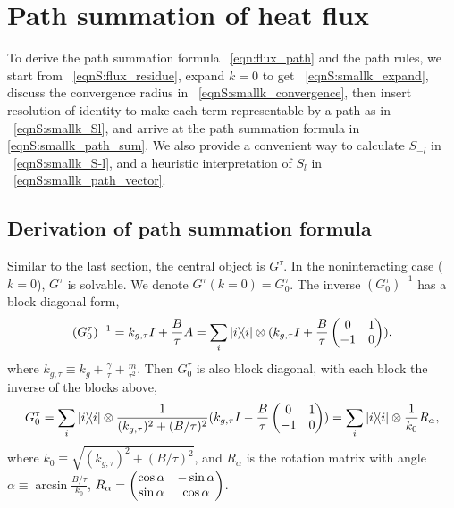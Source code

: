 \documentclass[
 amsmath,amssymb,
 aps,
 pre,
 longbibliography,
 10pt, onecolumn,
 notitlepage
]{revtex4-1}
\begin{document}
\section{Path summation of heat flux}
To derive the path summation formula \eqnname~\eqref{eqn:flux_path} and the path rules, we start from \eqnname~\eqref{eqnS:flux_residue}, expand $k=0$ to get \eqnname~\eqref{eqnS:smallk_expand}, discuss the convergence radius in \eqnname~\eqref{eqnS:smallk_convergence}, then insert resolution of identity to make each term representable by a path as in \eqnname~\eqref{eqnS:smallk_Sl}, and arrive at the path summation formula in \eqref{eqnS:smallk_path_sum}.
We also provide a convenient way to calculate $S_{-l}$ in \eqnname~\eqref{eqnS:smallk_S-l}, and a heuristic interpretation of $S_l$ in \eqnname~\eqref{eqnS:smallk_path_vector}.

\subsection{Derivation of path summation formula}
Similar to the last section, the central object is $G^\tau$.
In the noninteracting case ($k=0$), $G^\tau$ is solvable. We denote $G^\tau(k=0) = G^\tau_0$.
The inverse $(G^\tau_0)^{-1}$ has a block diagonal form,
\begin{equation}
    (G^\tau_0)^{-1} = k_{g,\tau} I + \frac{B}{\tau}A
    = \sum_i \ketbra{i}{i} \otimes (k_{g,\tau}I + \frac{B}{\tau} \pmqty{0 & 1 \\ -1 & 0}).
\end{equation}
where $k_{g,\tau} \equiv k_g + \frac{\gamma}{\tau} + \frac{m}{\tau^2}$.
Then $G^\tau_0$ is also block diagonal, with each block the inverse of the blocks above,
\begin{equation} \label{eqnS:smallk_Gtau0}
    G^\tau_0 = \sum_i \ketbra{i}{i} \otimes \frac{1}{(k_{g,\tau})^2 + (B/\tau)^2}(k_{g,\tau} I - \frac{B}{\tau} \pmqty{0 & 1 \\ -1 & 0})
    = \sum_i \ketbra{i}{i} \otimes \frac{1}{k_0}R_\alpha,
\end{equation}
where $k_0 \equiv \sqrt{(k_{g,\tau})^2 + (B/\tau)^2}$, and $R_\alpha$ is the rotation matrix with angle $\alpha \equiv \arcsin{\frac{B/\tau}{k_0}}$, $R_\alpha = \pmqty{\cos\alpha & -\sin\alpha \\ \sin\alpha & \cos\alpha}$.
\end{document}

